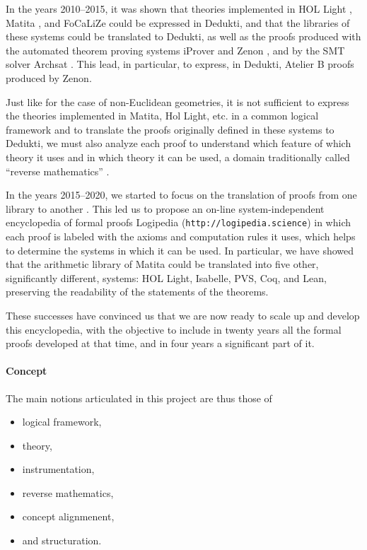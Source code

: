 In the years 2010--2015, it was shown that theories implemented in {\sc
HOL Light} \cite{Assaf12}, {\sc Matita} \cite{Assaf15}, and {\sc
FoCaLiZe} \cite{Cauderlier16} could be expressed in {\sc Dedukti}, and
that the libraries of these systems could be translated to {\sc
Dedukti}, as well as the proofs produced with the automated theorem
proving systems {\sc iProver} \cite{Burel10} and {\sc Zenon}
\cite{CauderlierHalmagrand15}, and by the SMT solver {\sc Archsat}
\cite{Bury19}. This lead, in particular, to express, in {\sc Dedukti}, {\sc
Atelier B} proofs produced by {\sc Zenon}.

Just like for the case of non-Euclidean geometries, it is not
sufficient to express the theories implemented in {\sc Matita}, {\sc
Hol Light}, etc.  in a common logical framework and to translate the
proofs originally defined in these systems to {\sc Dedukti}, we must
also analyze each proof to understand which feature of which theory it
uses and in which theory it can be used, a domain traditionally called
“reverse mathematics” \cite{Friedman76,Simpson09,Dowek17}.


In the years 2015--2020, we started to focus on the translation of
proofs from one library to another \cite{Dowek17,Thire18}. This led us
to propose an on-line system-independent encyclopedia of formal proofs
{\sc Logipedia} ({\tt http://logipedia.science}) in which each proof
is labeled with the axioms and computation rules it uses, which helps
to determine the systems in which it can be used. In particular, we
have showed that the arithmetic library of {\sc Matita} could be
translated into five other, significantly different, systems: {\sc HOL
Light}, {\sc Isabelle}, {\sc PVS}, {\sc Coq}, and {\sc Lean},
preserving the readability of the statements of the theorems.

These successes have convinced us that we are now ready to scale up
and develop this encyclopedia, with the objective to include in twenty
years all the formal proofs developed at that time, and in four years a
significant part of it. 

\paragraph{Concept}

The main notions articulated in this project are thus those of
\begin{itemize}
\item logical framework,
\item theory,
\item instrumentation,
\item reverse mathematics,
\item concept alignmenent,
\item and structuration.
\end{itemize}

